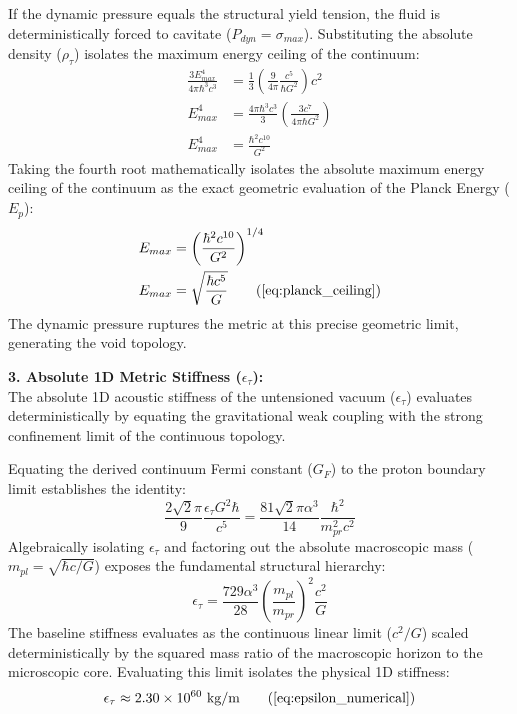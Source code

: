 \documentclass[11pt, a4paper]{article}
\begin{document}
If the dynamic pressure equals the structural yield tension, the fluid is deterministically forced to cavitate ($P_{dyn} = \sigma_{max}$). Substituting the absolute density ($\rho_{\tau}$) isolates the maximum energy ceiling of the continuum:
\begin{align}
    \frac{3E_{max}^4}{4\pi \hbar^3 c^3} &= \frac{1}{3} \left( \frac{9}{4\pi} \frac{c^5}{\hbar G^2} \right) c^2 \label{eq:cavitation_equivalence} \\
    E_{max}^4 &= \frac{4\pi \hbar^3 c^3}{3} \left( \frac{3 c^7}{4\pi \hbar G^2} \right) \label{eq:energy_isolation_a} \\
    E_{max}^4 &= \frac{\hbar^2 c^{10}}{G^2} \label{eq:energy_isolation_b}
\end{align}
Taking the fourth root mathematically isolates the absolute maximum energy ceiling of the continuum as the exact geometric evaluation of the Planck Energy ($E_p$):
\begin{align}
    E_{max} &= \left( \frac{\hbar^2 c^{10}}{G^2} \right)^{1/4} \label{eq:energy_fourth_root} \\
    E_{max} &= \sqrt{\frac{\hbar c^5}{G}} \tag{\ref{eq:planck_ceiling}}
\end{align}
The dynamic pressure ruptures the metric at this precise geometric limit, generating the void topology.

\textbf{3. Absolute 1D Metric Stiffness ($\epsilon_{\tau}$):} \\
The absolute 1D acoustic stiffness of the untensioned vacuum ($\epsilon_{\tau}$) evaluates deterministically by equating the gravitational weak coupling with the strong confinement limit of the continuous topology. 

Equating the derived continuum Fermi constant ($G_F$) to the proton boundary limit establishes the identity:
\begin{equation}
    \frac{2\sqrt{2}\pi}{9} \frac{\epsilon_{\tau} G^2 \hbar}{c^5} = \frac{81\sqrt{2}\pi\alpha^3}{14} \frac{\hbar^2}{m_{pr}^2 c^2} \label{eq:fermi_proton_identity}
\end{equation}
Algebraically isolating $\epsilon_{\tau}$ and factoring out the absolute macroscopic mass ($m_{pl} = \sqrt{\hbar c / G}$) exposes the fundamental structural hierarchy:
\begin{equation}
    \epsilon_{\tau} = \frac{729 \alpha^3}{28} \left( \frac{m_{pl}}{m_{pr}} \right)^2 \frac{c^2}{G} \label{eq:epsilon_analytical}
\end{equation}
The baseline stiffness evaluates as the continuous linear limit ($c^2/G$) scaled deterministically by the squared mass ratio of the macroscopic horizon to the microscopic core. Evaluating this limit isolates the physical 1D stiffness:
\begin{equation}
    \epsilon_{\tau} \approx 2.30 \times 10^{60} \text{ kg/m} \tag{\ref{eq:epsilon_numerical}}
\end{equation}
\end{document}
